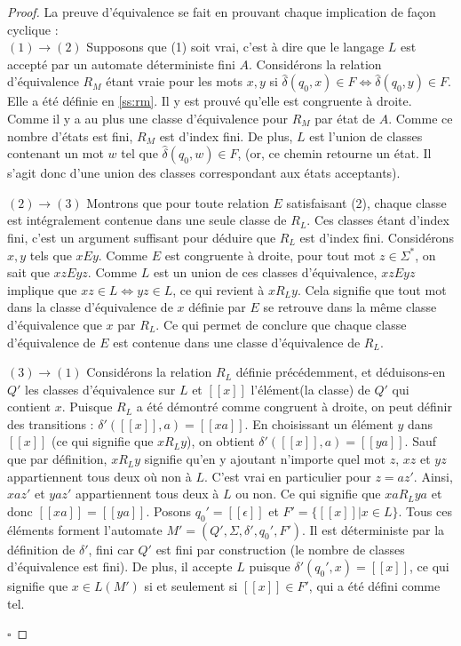 	\begin{proof}La preuve d'équivalence se fait en prouvant chaque implication de façon cyclique :\\

		$(1)\rightarrow(2)$ Supposons que (1) soit vrai, c'est à dire que le langage $L$ est accepté par un automate déterministe fini $A$. Considérons la relation d'équivalence $R_M$ étant vraie pour les mots $x,y$ si $\hat{\delta}(q_0,x)\in F \iff \hat{\delta}(q_0,y)\in F$. Elle a été définie en \ref{ss:rm}. Il y est prouvé qu'elle est congruente à droite. Comme il y a au plus une classe d'équivalence pour $R_M$ par état de $A$. Comme ce nombre d'états est fini, $R_M$ est d'index fini. De plus, $L$ est l'union de classes contenant un mot $w$ tel que $\hat{\delta}(q_0,w) \in F$, (or, ce chemin retourne un état. Il s'agit donc d'une union des classes correspondant aux états acceptants).

		$(2)\rightarrow(3)$ Montrons que pour toute relation $E$ satisfaisant (2), chaque classe est intégralement contenue dans une seule classe de $R_L$. Ces classes étant d'index fini, c'est un argument suffisant pour déduire que $R_L$ est d'index fini. Considérons $x,y$ tels que $xEy$. Comme $E$ est congruente à droite, pour tout mot $z \in \Sigma^*$, on sait que $xzEyz$. Comme $L$ est un union de ces classes d'équivalence, $xzEyz$ implique que $xz \in L \Leftrightarrow yz \in L$, ce qui revient à $xR_Ly$. Cela signifie que tout mot dans la classe d'équivalence de $x$ définie par $E$ se retrouve dans la même classe d'équivalence que $x$ par $R_L$. Ce qui permet de conclure que chaque classe d'équivalence de $E$ est contenue dans une classe d'équivalence de $R_L$.


		$(3)\rightarrow(1)$ Considérons la relation $R_L$ définie précédemment, et déduisons-en $Q'$ les classes d'équivalence sur $L$ et $[[x]]$ l'élément(la classe) de $Q'$ qui contient $x$. Puisque $R_L$ a été démontré comme congruent à droite, on peut définir des transitions : $\delta'([[x]],a) = [[xa]]$. En choisissant un élément $y$ dans $[[x]]$ (ce qui signifie que $xR_Ly$), on obtient $\delta'([[x]],a)=[[ya]]$. Sauf que par définition, $xR_Ly$ signifie qu'en y ajoutant n'importe quel mot $z$, $xz$ et $yz$ appartiennent tous deux où non à $L$. C'est vrai en particulier pour $z=az'$. Ainsi, $xaz'$ et $yaz'$ appartiennent tous deux à $L$ ou non. Ce qui signifie que $xaR_Lya$ et donc $[[xa]]=[[ya]]$. Posons $q_0'=[[\epsilon]]$ et $F' = \{[[x]]|x \in L\}$. Tous ces éléments forment l'automate $M'=(Q', \Sigma, \delta', q_0', F')$. Il est déterministe par la définition de $\delta'$, fini car $Q'$ est fini par construction (le nombre de classes d'équivalence est fini). De plus, il accepte $L$ puisque $\delta'(q_0',x)=[[x]]$, ce qui signifie que $x \in L(M')$ si et seulement si $[[x]] \in F'$, qui a été défini comme tel.


		\hfill$\square$
	\end{proof}


